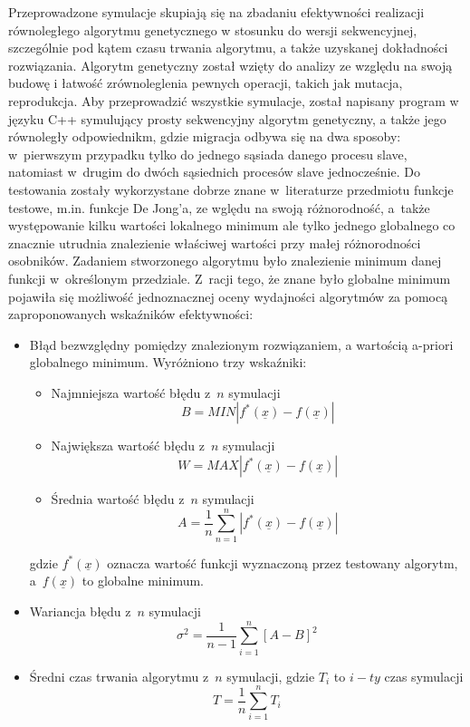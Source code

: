 Przeprowadzone symulacje skupiają się na zbadaniu efektywności realizacji
równoległego algorytmu genetycznego w stosunku do wersji sekwencyjnej,
szczególnie pod kątem czasu trwania algorytmu, a także uzyskanej dokładności
rozwiązania. Algorytm genetyczny został wzięty do analizy ze względu na
swoją budowę i łatwość zrównoleglenia pewnych operacji, takich jak mutacja,
reprodukcja. Aby przeprowadzić wszystkie symulacje, został napisany program w
języku C++ symulujący prosty sekwencyjny algorytm genetyczny, a także jego
równoległy odpowiednikm, gdzie migracja odbywa się na dwa sposoby: w~pierwszym
przypadku tylko do jednego sąsiada danego procesu slave, natomiast w~drugim do
dwóch sąsiednich procesów slave jednocześnie. Do testowania zostały wykorzystane
dobrze znane w~literaturze przedmiotu funkcje testowe, m.in. funkcje De Jong'a,
ze wględu na swoją różnorodność, a~także występowanie kilku wartości lokalnego
minimum ale tylko jednego globalnego co znacznie utrudnia znalezienie właściwej
wartości przy małej różnorodności osobników. 
Zadaniem stworzonego algorytmu było znalezienie minimum danej funkcji w~określonym przedziale.
Z~racji tego, że znane było globalne minimum pojawiła się możliwość
jednoznacznej oceny wydajności algorytmów za pomocą zaproponowanych wskaźników
efektywności:
\begin{itemize}
	\item Błąd bezwzględny pomiędzy znalezionym rozwiązaniem, a wartością
		a-priori globalnego minimum. Wyróżniono trzy wskaźniki:
		\begin{itemize}
			\item Najmniejsza wartość błędu z~$n$ symulacji 
				\begin{equation}
					B=MIN\left | f^{*}(\underline{x})-f(\underline{x}) \right |
					\label{min1}
				\end{equation}
			\item Największa wartość błędu z~$n$ symulacji 
				\begin{equation}
					W=MAX\left | f^{*}(\underline{x})-f(\underline{x}) \right |
					\label{min3}
				\end{equation}
			\item Średnia wartość błędu z~$n$ symulacji
				\begin{equation}
					A=\frac{1}{n}\sum_{n=1}^n\left | f^{*}(\underline{x})-f(\underline{x}) \right |
					\label{min2}
				\end{equation}
		\end{itemize}
		gdzie $f^{*}(\underline{x})$ oznacza wartość funkcji wyznaczoną przez
		testowany algorytm, a~$f(\underline{x})$ to globalne minimum.
	\item Wariancja błędu z~$n$ symulacji 
		\begin{equation}
			\sigma^2=\frac{1}{n-1}\sum_{i=1}^n\left[A-B\right]^2
			\label{min4}
		\end{equation}
	\item Średni czas trwania algorytmu z~$n$ symulacji, gdzie $T_i$ to $i-ty$ 
		czas symulacji
		\begin{equation}
			T=\frac{1}{n}\sum_{i=1}^nT_i
			\label{min4}
		\end{equation}
\end{itemize}


